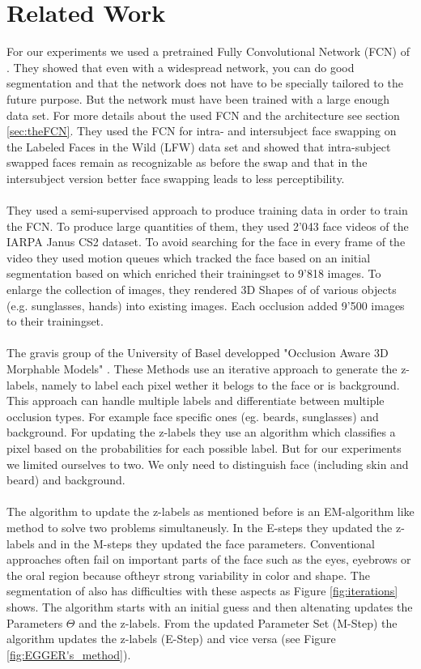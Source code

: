 \section{Related Work}
For our experiments we used a pretrained Fully Convolutional Network (FCN) of \cite{nirkin2018_faceswap}. They showed that even with a widespread network, you can do good segmentation and that the network does not have to be specially tailored to the future purpose. But the network must have been trained with a large enough data set. For more details about the used FCN and the architecture see section \ref{sec:theFCN}. They used the FCN for intra- and intersubject face swapping on the Labeled Faces in the Wild (LFW) data set and showed that intra-subject swapped faces remain as recognizable as before the swap and that in the intersubject version better face swapping  leads to less perceptibility.\\
\\
They used a semi-supervised approach to produce training data in order to train the FCN. To produce large quantities of them, they used 2'043 face videos of the IARPA Janus CS2 dataset. To avoid searching for the face in every frame of the video they used motion queues which tracked the face based on an initial segmentation based on \cite{grundmann} which enriched their trainingset to 9'818 images. To enlarge the collection of images, they rendered 3D Shapes of of various objects (e.g. sunglasses, hands) into existing images. Each occlusion added 9'500 images to their trainingset.\\
\\
The gravis group of the University of Basel developped "Occlusion Aware 3D Morphable Models" \cite{egger_paper}. These Methods use an iterative approach to generate the z-labels, namely to label each pixel wether it belogs to the face or is background. This approach can handle multiple labels and differentiate between multiple occlusion types. For example face specific ones (eg. beards, sunglasses) and background. For updating the z-labels they use an algorithm which classifies a pixel based on the probabilities for each possible label.  But for our experiments we limited ourselves to two. We only need to distinguish face (including skin and beard) and background.\\ 
\\
The algorithm to update the z-labels as mentioned before is an EM-algorithm like method to solve two problems simultaneusly. In the E-steps they updated the z-labels and in the M-steps they updated the face parameters. Conventional approaches often fail on important parts of the face such as the eyes, eyebrows or the oral region because oftheyr strong variability in color and shape. The segmentation of \cite{egger_paper} also has difficulties with these aspects as Figure \ref{fig:iterations} shows. The algorithm starts with an initial guess and then altenating updates the Parameters $\Theta$ and the z-labels. From the updated Parameter Set (M-Step) the algorithm updates the z-labels (E-Step) and vice versa (see Figure \ref{fig:EGGER's_method}).\\
